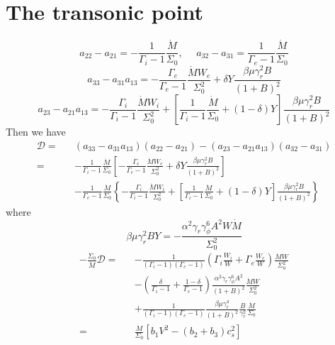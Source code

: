 \documentclass[12pt]{book}
\begin{document}
\section{The transonic point}
\begin{equation}
 a_{22}-a_{21}=-\frac{1}{\Gamma_i-1}\frac{\dot M}{\Sigma_0},~~~~~~
a_{32}-a_{31}=\frac{1}{\Gamma_e-1}\frac{\dot M}{\Sigma_0}
\end{equation}
\begin{equation}
a_{33}-a_{31}a_{13}=-\frac{\Gamma_e}{\Gamma_e-1}\frac{\dot M W_e}{\Sigma_0^2}+\delta Y \frac{\beta\mu\gamma_r^2B}{(1+B)^2}
\end{equation}
\begin{equation}
a_{23}-a_{21}a_{13}=-\frac{\Gamma_i}{\Gamma_i-1}\frac{\dot M W_i}{\Sigma_0^2} +
\left[\frac{1}{\Gamma_i-1}\frac{\dot M}{\Sigma_0} +(1-\delta) Y\right] \frac{\beta\mu\gamma_r^2B}{(1+B)^2}
\end{equation}
Then we have
\begin{eqnarray}
 \mathcal{D}=&&(a_{33}-a_{31}a_{13})(a_{22}-a_{21})-(a_{23}-a_{21}a_{13})(a_{32}-a_{31})\nonumber\\
=&&-\frac{1}{\Gamma_i-1}\frac{\dot M}{\Sigma_0}\left[-\frac{\Gamma_e}{\Gamma_e-1}\frac{\dot M W_e}{\Sigma_0^2}+\delta Y \frac{\beta\mu\gamma_r^2B}{(1+B)^2}\right]\nonumber\\
&&-\frac{1}{\Gamma_e-1}\frac{\dot M}{\Sigma_0}\left\{
-\frac{\Gamma_i}{\Gamma_i-1}\frac{\dot M W_i}{\Sigma_0^2} +
\left[\frac{1}{\Gamma_i-1}\frac{\dot M}{\Sigma_0} +(1-\delta) Y\right] \frac{\beta\mu\gamma_r^2B}{(1+B)^2}
\right\}
\end{eqnarray}
where
\begin{equation}
 \beta\mu\gamma_r^2BY=-\frac{\alpha^2\gamma_r\gamma_\phi^6A^2 W\dot M}{\Sigma_0^2}
\end{equation}
\begin{eqnarray}
-\frac{\Sigma_0}{\dot M}\mathcal{D}=&&-\frac{1}{(\Gamma_i-1)(\Gamma_e-1)}\left(\Gamma_i\frac{W_i}{W}+\Gamma_e\frac{W_e}{W}\right)
\frac{\dot M W}{\Sigma_0^2}\nonumber\\
&&-\left(\frac{\delta}{\Gamma_i-1}+\frac{1-\delta}{\Gamma_e-1}\right)\frac{\alpha^2\gamma_r\gamma_\phi^6A^2}{(1+B)^2}
\frac{\dot M W}{\Sigma_0^2}\nonumber\\
&&+\frac{1}{(\Gamma_i-1)(\Gamma_e-1)}\frac{\beta\mu\gamma_r^4}{(1+B)^2}\frac{B}{\gamma_r^2}\frac{\dot M}{\Sigma_0}\nonumber\\
=&&\frac{\dot M}{\Sigma_0}[b_1V^2-(b_2+b_3)c_s^2]
\end{eqnarray}
\end{document}
